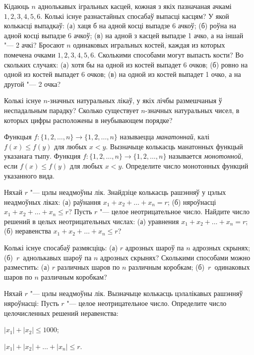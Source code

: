 \documentclass[12pt, a4paper]{article}
\begin{document}
\begin{problemList}
\bigskip

\problemItemSimple
{Кідаюць $n$ аднолькавых ігральных касцей, кожная з якіх пазначаная ачкамі $1, 2, 3, 4, 5, 6$.
Колькі існуе разнастайных спосабаў выпасці касцям? У якой колькасці выпадкаў:
(а) хаця б на адной косці выпадзе 6 ачкоў; (б) роўна на адной косці выпадзе 6 ачкоў;
(в) на адной з касцей выпадзе 1 ачко, а на іншай "--- 2 ачкі?}
{Бросают $n$ одинаковых игральных костей, каждая из которых помечена
очками $1, 2, 3, 4, 5, 6$. Сколькими способами могут выпасть кости?
Во скольких случаях: (а) хотя бы на одной из костей выпадет 6 очков;
(б) ровно на одной из костей выпадет 6 очков; (в) на одной из костей
выпадет 1 очко, а на другой "--- 2 очка?}

\bigskip

\problemItemSimple
{Колькі існуе $n$-значных натуральных лікаў, у якіх лічбы размешчаныя ў неспадальным парадку?}
{Сколько существует $n$-значных натуральных чисел, в
которых цифры расположены в неубывающем порядке?}

\bigskip

\problemItemSimple
{Функцыя $f \colon \{1, 2, \ldots, n\} \to \{1, 2, \ldots, n\}$
называецца \emph{манатоннай}, калі $f(x) \le f(y)$ для любых $x < y$.
Вызначыце колькасць манатонных функцый указанага тыпу.}
{Функция $f \colon \{1, 2, \ldots, n\} \to \{1, 2, \ldots, n\}$
называется \emph{монотонной}, если $f(x) \le f(y)$ для любых $x < y$.
Определите число монотонных функций указанного вида.}

\bigskip

\problemItemSimple
{Няхай $r$ "--- цэлы неадмоўны лік. Знайдзіце колькасць рашэнняў у цэлых
неадмоўных ліках: (а) раўнання $x_1 + x_2 + \ldots + x_n = r$;
(б) няроўнасці $x_1 + x_2 + \ldots + x_n \le r$?}
{Пусть $r$ "--- целое неотрицательное число. Найдите число решений в
целых неотрицательных числах: (а) уравнения
$x_1 + x_2 + \ldots + x_n = r$; (б) неравенства
$x_1 + x_2 + \ldots + x_n \le r$?}

\bigskip

\problemItemSimple
{Колькі існуе спосабаў размясціць: (а) $r$ адрозных шароў па $n$
адрозных скрынях; (б)~$r$~аднолькавых шароў па $n$ адрозных скрынях?}
{Сколькими способами можно разместить: (а) $r$ различных шаров по $n$
различным коробкам; (б)~$r$~одинаковых шаров по $n$ различным коробкам?}

\bigskip

\problemItemWithCommonPart
{Няхай $r$ "--- цэлы неадмоўны лік. Вызначыце колькасць цэлалікавых рашэнняў няроўнасці:}
{Пусть $r$ "--- целое неотрицательное число. Определите число
целочисленных решений неравенства:}
{%
\begin{belarusianEnumerate}
    \item $|x_1| + |x_2| \le 1000$;
    \item $|x_1| + |x_2| + \ldots + |x_n| \le r$.
\end{belarusianEnumerate}
}


\end{problemList}
\end{document}
